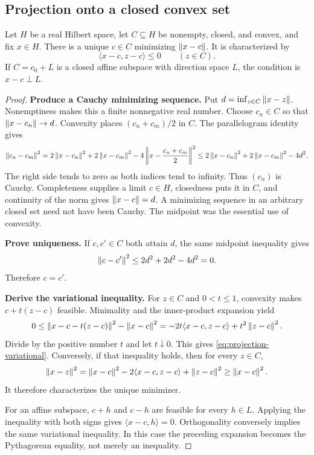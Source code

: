 \subsection{Projection onto a closed convex set}
\begin{lemma}\label{lem:projection-tool}
Let \(H\) be a real Hilbert space, let \(C\subseteq H\) be nonempty, closed, and convex, and fix \(x\in H\). There is a unique \(c\in C\) minimizing \(\left\lVert x-c\right\rVert\). It is characterized by
\begin{equation}\label{eq:projection-variational}
 \langle x-c,z-c\rangle\le0\qquad(z\in C).
\end{equation}
If \(C=c_0+L\) is a closed affine subspace with direction space \(L\), the condition is \(x-c\perp L\).
\end{lemma}
\begin{proof}
\textbf{Produce a Cauchy minimizing sequence.} Put \(d=\inf_{z\in C}\left\lVert x-z\right\rVert\). Nonemptiness makes this a finite nonnegative real number. Choose \(c_n\in C\) so that \(\left\lVert x-c_n\right\rVert\to d\). Convexity places \((c_n+c_m)/2\) in \(C\). The parallelogram identity gives
\[
 \left\lVert c_n-c_m\right\rVert^2
 =2\left\lVert x-c_n\right\rVert^2+2\left\lVert x-c_m\right\rVert^2
   -4\left\|x-\frac{c_n+c_m}{2}\right\|^2
 \le2\left\lVert x-c_n\right\rVert^2+2\left\lVert x-c_m\right\rVert^2-4d^2.
\]
The right side tends to zero as both indices tend to infinity. Thus \((c_n)\) is Cauchy. Completeness supplies a limit \(c\in H\), closedness puts it in \(C\), and continuity of the norm gives \(\left\lVert x-c\right\rVert=d\). A minimizing sequence in an arbitrary closed set need not have been Cauchy. The midpoint was the essential use of convexity.

\textbf{Prove uniqueness.} If \(c,c'\in C\) both attain \(d\), the same midpoint inequality gives
\[
 \left\lVert c-c'\right\rVert^2\le2d^2+2d^2-4d^2=0.
\]
Therefore \(c=c'\).

\textbf{Derive the variational inequality.} For \(z\in C\) and \(0<t\le1\), convexity makes \(c+t(z-c)\) feasible. Minimality and the inner-product expansion yield
\[
 0\le\left\lVert x-c-t(z-c)\right\rVert^2-\left\lVert x-c\right\rVert^2
   =-2t\langle x-c,z-c\rangle+t^2\left\lVert z-c\right\rVert^2.
\]
Divide by the positive number \(t\) and let \(t\downarrow0\). This gives \eqref{eq:projection-variational}. Conversely, if that inequality holds, then for every \(z\in C\),
\[
 \left\lVert x-z\right\rVert^2
 =\left\lVert x-c\right\rVert^2-2\langle x-c,z-c\rangle+\left\lVert z-c\right\rVert^2
 \ge\left\lVert x-c\right\rVert^2.
\]
It therefore characterizes the unique minimizer.

For an affine subspace, \(c+h\) and \(c-h\) are feasible for every \(h\in L\). Applying the inequality with both signs gives \(\langle x-c,h\rangle=0\). Orthogonality conversely implies the same variational inequality. In this case the preceding expansion becomes the Pythagorean equality, not merely an inequality.
\end{proof}

